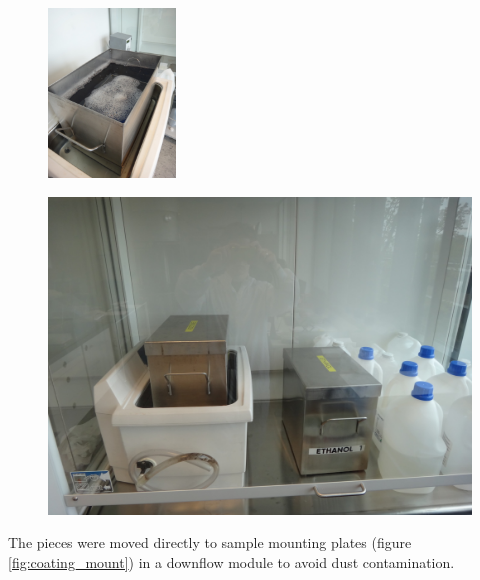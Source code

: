 \begin{figure}[htbp]
\centering
\begin{minipage}{.46\textwidth}
  \centering
  \includegraphics[height=4.5cm,trim= 0 100 0 200,clip]{figures/cast/soap_bath.jpg}
  \label{fig:cast_cleaning_soap}
\end{minipage}%
\hspace{20pt}
\begin{minipage}{.46\textwidth}
  \centering
  \includegraphics[width=0.9\linewidth]{figures/cast/acetone_and_ethanol.jpg}
  \label{fig:cast_cleaning_ethanol}
\end{minipage}
\end{figure}

The pieces were moved directly to sample mounting plates (figure \ref{fig:coating_mount}) in a downflow module to avoid dust contamination.

